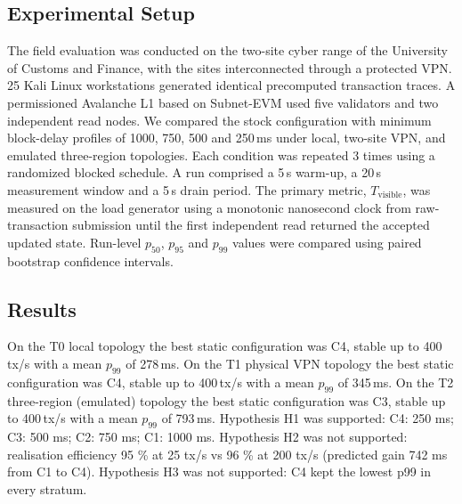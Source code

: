 \subsection{Experimental Setup}
The field evaluation was conducted on the two-site cyber range of the University of Customs and Finance, with the sites interconnected through a protected VPN. 25 Kali Linux workstations generated identical precomputed transaction traces. A permissioned Avalanche L1 based on Subnet-EVM used five validators and two independent read nodes. We compared the stock configuration with minimum block-delay profiles of 1000, 750, 500 and 250\,ms under local, two-site VPN, and emulated three-region topologies. Each condition was repeated 3 times using a randomized blocked schedule. A run comprised a 5\,s warm-up, a 20\,s measurement window and a 5\,s drain period. The primary metric, $T_\mathrm{visible}$, was measured on the load generator using a monotonic nanosecond clock from raw-transaction submission until the first independent read returned the accepted updated state. Run-level $p_{50}$, $p_{95}$ and $p_{99}$ values were compared using paired bootstrap confidence intervals.

\subsection{Results}
On the T0 local topology the best static configuration was C4, stable up to 400\,tx/s with a mean $p_{99}$ of 278\,ms.
On the T1 physical VPN topology the best static configuration was C4, stable up to 400\,tx/s with a mean $p_{99}$ of 345\,ms.
On the T2 three-region (emulated) topology the best static configuration was C3, stable up to 400\,tx/s with a mean $p_{99}$ of 793\,ms.
Hypothesis H1 was supported: C4: 250 ms; C3: 500 ms; C2: 750 ms; C1: 1000 ms.
Hypothesis H2 was not supported: realisation efficiency 95 \% at 25 tx/s vs 96 \% at 200 tx/s (predicted gain 742 ms from C1 to C4).
Hypothesis H3 was not supported: C4 kept the lowest p99 in every stratum.
